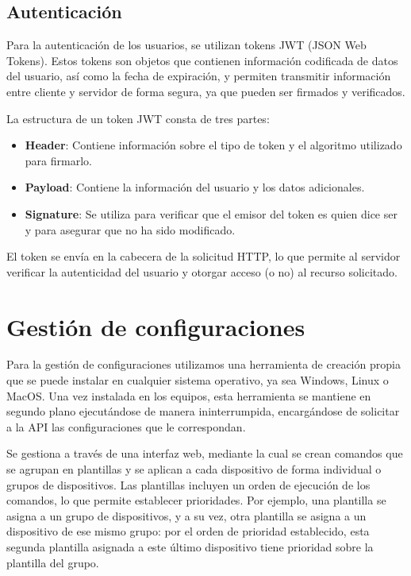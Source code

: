

\subsection{Autenticación}\label{subsec:autenticacion}

Para la autenticación de los usuarios, se utilizan tokens JWT (JSON Web Tokens)\cite{fusionauthJWT}.
Estos tokens son objetos que contienen información codificada de datos del usuario, así como la fecha de expiración,
y permiten transmitir información entre cliente y servidor de forma segura, ya que pueden ser firmados y verificados.

La estructura de un token JWT consta de tres partes:

\begin{itemize}
	\item \textbf{Header}: Contiene información sobre el tipo de token y el algoritmo utilizado para firmarlo.
	\item \textbf{Payload}: Contiene la información del usuario y los datos adicionales.
	\item \textbf{Signature}: Se utiliza para verificar que el emisor del token es quien dice ser y para asegurar que
	no ha sido modificado.
\end{itemize}

El token se envía en la cabecera de la solicitud HTTP, lo que permite al servidor verificar la autenticidad del usuario
y otorgar acceso (o no) al recurso solicitado.

\section{Gestión de configuraciones}\label{sec:gestion-de-configuraciones}

Para la gestión de configuraciones utilizamos una herramienta de creación propia que se puede instalar en cualquier sistema
operativo, ya sea Windows, Linux o MacOS\@.
Una vez instalada en los equipos, esta herramienta se mantiene en segundo plano ejecutándose de manera ininterrumpida, encargándose de solicitar
a la API las configuraciones que le correspondan.

Se gestiona a través de una interfaz web, mediante la cual se crean comandos que se agrupan en plantillas y se aplican
a cada dispositivo de forma individual o grupos de dispositivos.
Las plantillas incluyen un orden de ejecución de los comandos, lo que permite establecer prioridades. Por ejemplo,
una plantilla se asigna a un grupo de dispositivos, y a su vez, otra plantilla se asigna a un dispositivo de ese mismo
grupo: por el orden de prioridad establecido, esta segunda plantilla asignada a este último dispositivo tiene prioridad
sobre la plantilla del grupo.

